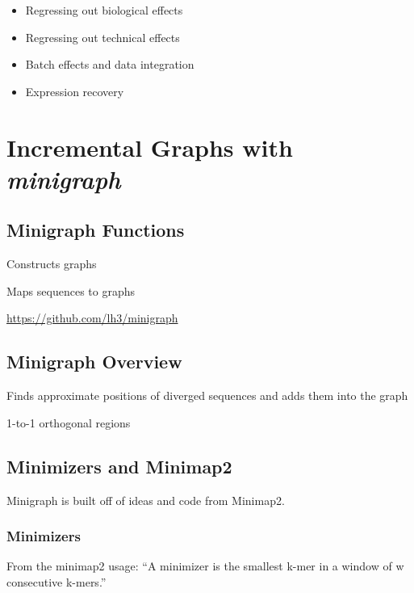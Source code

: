 \documentclass[
]{book}
\providecommand{\tightlist}{%
  \setlength{\itemsep}{0pt}\setlength{\parskip}{0pt}}
\begin{document}
\begin{itemize}
\tightlist
\item
  Regressing out biological effects
\item
  Regressing out technical effects
\item
  Batch effects and data integration
\item
  Expression recovery
\end{itemize}

\hypertarget{incremental-graphs-with-minigraph}{%
\chapter{\texorpdfstring{Incremental Graphs with \emph{minigraph}}{Incremental Graphs with minigraph}}\label{incremental-graphs-with-minigraph}}

\hypertarget{minigraph-functions}{%
\section{Minigraph Functions}\label{minigraph-functions}}

Constructs graphs

Maps sequences to graphs

\url{https://github.com/lh3/minigraph}

\hypertarget{minigraph-overview}{%
\section{Minigraph Overview}\label{minigraph-overview}}

Finds approximate positions of diverged sequences and adds them into the graph

1-to-1 orthogonal regions

\hypertarget{minimizers-and-minimap2}{%
\section{Minimizers and Minimap2}\label{minimizers-and-minimap2}}

Minigraph is built off of ideas and code from Minimap2.

\hypertarget{minimizers}{%
\subsection*{Minimizers}\label{minimizers}}

From the minimap2 usage:
``A minimizer is the smallest k-mer in a window of w consecutive k-mers.''
\end{document}

